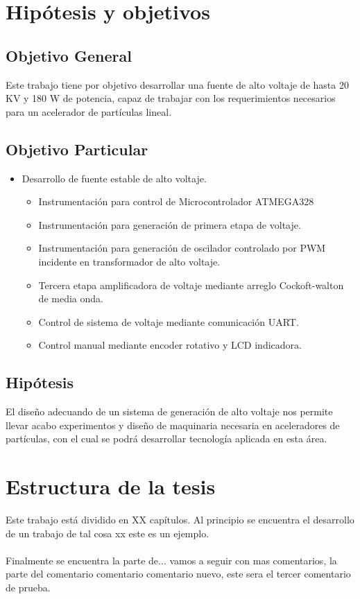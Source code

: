 \section{Hipótesis y objetivos}

\subsection{Objetivo General}

Este trabajo tiene por objetivo desarrollar una fuente de alto voltaje de hasta 20 KV y 180 W de potencia, capaz de trabajar con los requerimientos necesarios para un acelerador de partículas lineal.

\subsection{Objetivo Particular}


\begin{itemize}
\item Desarrollo de fuente estable de alto voltaje.
\begin{itemize}
\item Instrumentación para control de Microcontrolador ATMEGA328
\item Instrumentación para generación de primera etapa de voltaje.
\item Instrumentación para generación de oscilador controlado por PWM incidente en transformador de alto voltaje.
\item Tercera etapa amplificadora de voltaje mediante arreglo Cockoft-walton de media onda.
\item Control de sistema de voltaje mediante comunicación UART.
\item Control manual mediante encoder rotativo y LCD indicadora.
\
\end{itemize}  
\end{itemize}

\subsection{Hipótesis}
El diseño adecuando de un sistema de generación de alto voltaje nos permite llevar acabo experimentos y diseño de maquinaria necesaria en aceleradores de partículas, con el cual se podrá desarrollar tecnología aplicada en esta área.


\section{Estructura de la tesis}

Este trabajo está dividido en XX capítulos. Al principio se encuentra el desarrollo de un trabajo de tal cosa xx este es un ejemplo.
\\\\
Finalmente se encuentra la parte de... vamos a seguir con mas comentarios, la parte del comentario comentario comentario nuevo, este sera el tercer comentario de prueba.